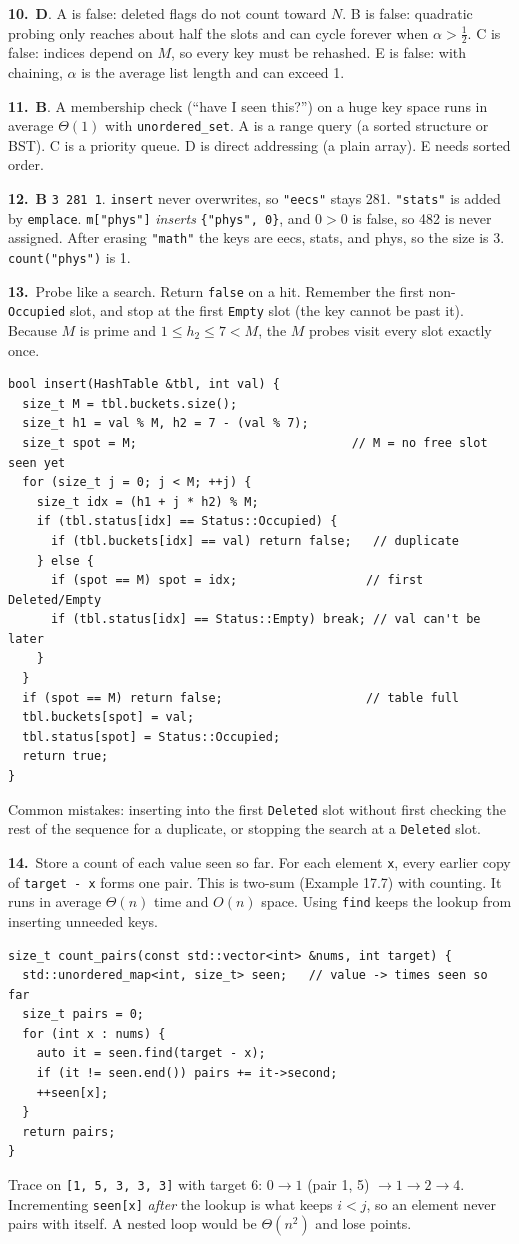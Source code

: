 \documentclass[11pt]{article}
\newcounter{q}
\newcommand{\answer}[1]{\par\vspace{6pt}\textbf{#1.}~}
\begin{document}
\answer{10}\textbf{D}. A is false: deleted flags do not count toward $N$. B is false: quadratic probing only reaches about half the slots
and can cycle forever when $\alpha > \tfrac12$. C is false: indices depend on $M$, so every key must be rehashed. E is false: with chaining,
$\alpha$ is the average list length and can exceed 1.


\answer{11}\textbf{B}. A membership check (``have I seen this?'') on a huge key space runs in average $\Theta(1)$ with \texttt{unordered\_set}.
A is a range query (a sorted structure or BST). C is a priority queue. D is direct addressing (a plain array). E needs sorted order.


\answer{12}\textbf{B} \texttt{3 281 1}. \texttt{insert} never overwrites, so \texttt{"eecs"} stays 281. \texttt{"stats"} is added by \texttt{emplace}.
\texttt{m["phys"]} \emph{inserts} \texttt{\{"phys", 0\}}, and $0 > 0$ is false, so 482 is never assigned. After erasing \texttt{"math"} the keys are
eecs, stats, and phys, so the size is 3. \texttt{count("phys")} is 1.


\answer{13}Probe like a search. Return \texttt{false} on a hit. Remember the first non-\texttt{Occupied} slot, and stop at the first \texttt{Empty} slot
(the key cannot be past it). Because $M$ is prime and $1 \le h_2 \le 7 < M$, the $M$ probes visit every slot exactly once.
\begin{lstlisting}
bool insert(HashTable &tbl, int val) {
  size_t M = tbl.buckets.size();
  size_t h1 = val % M, h2 = 7 - (val % 7);
  size_t spot = M;                              // M = no free slot seen yet
  for (size_t j = 0; j < M; ++j) {
    size_t idx = (h1 + j * h2) % M;
    if (tbl.status[idx] == Status::Occupied) {
      if (tbl.buckets[idx] == val) return false;   // duplicate
    } else {
      if (spot == M) spot = idx;                  // first Deleted/Empty
      if (tbl.status[idx] == Status::Empty) break; // val can't be later
    }
  }
  if (spot == M) return false;                    // table full
  tbl.buckets[spot] = val;
  tbl.status[spot] = Status::Occupied;
  return true;
}
\end{lstlisting}
Common mistakes: inserting into the first \texttt{Deleted} slot without first checking the rest of the sequence for a duplicate,
or stopping the search at a \texttt{Deleted} slot.


\answer{14}Store a count of each value seen so far. For each element \texttt{x}, every earlier copy of \texttt{target - x} forms one pair.
This is two-sum (Example 17.7) with counting. It runs in average $\Theta(n)$ time and $O(n)$ space. Using \texttt{find} keeps the lookup from inserting
unneeded keys.
\begin{lstlisting}
size_t count_pairs(const std::vector<int> &nums, int target) {
  std::unordered_map<int, size_t> seen;   // value -> times seen so far
  size_t pairs = 0;
  for (int x : nums) {
    auto it = seen.find(target - x);
    if (it != seen.end()) pairs += it->second;
    ++seen[x];
  }
  return pairs;
}
\end{lstlisting}
Trace on \texttt{[1, 5, 3, 3, 3]} with target 6: $0 \to 1$ (pair 1, 5) $\to 1 \to 2 \to 4$. Incrementing \texttt{seen[x]} \emph{after} the lookup is
what keeps $i < j$, so an element never pairs with itself. A nested loop would be $\Theta(n^2)$ and lose points.
\end{document}
